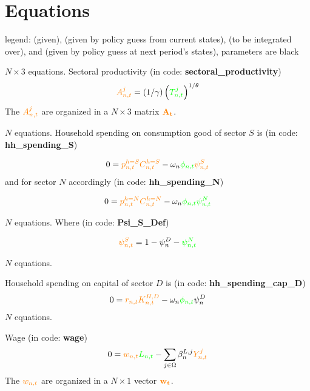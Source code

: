 \documentclass[12pt, bibtotoc, tablecaptionabove, figurecaptionabove, fleqn]{article}
\newcommand{\cl}[1]{{\color{orange}{#1}}}
\newcommand{\st}[1]{{\color{green}{#1}}}
\newcommand{\stnext}[1]{{\color{magenta}{#1}}}
\newcommand{\clnext}[1]{{\color{blue}{#1}}}
\begin{document}
\section{Equations}

legend: \st{states in green} (given), \cl{controls in orange} (given by policy guess from current states), \stnext{next period's exogenous states in magenta} (to be integrated over), and \clnext{next period's controls in blue} (given by policy guess at next period's states), parameters are black\vspace{5mm}

\noindent $N \times 3$ equations. Sectoral productivity (in code: {\bf{sectoral\_productivity}})
\begin{equation}
\cl{A_{n, t}^{j}}=(1 / \gamma)\left(\st{T_{n, t}^{j}}\right)^{1 / \theta}
\end{equation}
The $\cl{A^j_{n,t}}$ are organized in a $ N \times 3$ matrix $\mathbf{\cl{A_t}}$.


$N$ equations. Household spending on consumption good of sector $S$ is (in code: {\bf{hh\_spending\_S}}) 

\begin{equation}
0 = \cl{p^{h=S}_{n,t}} \cl{C^{h=S}_{n,t}} - \omega_n \st{\phi_{n,t}} \cl{\psi_{n,t}^S}
\end{equation}
and for sector $N$ accordingly (in code: {\bf{hh\_spending\_N}})

\begin{equation}
0 = \cl{p^{h=N}_{n,t}} \cl{C^{h=N}_{n,t}} - \omega_n \st{\phi_{n,t}} \st{\psi_{n,t}^N}
\end{equation}

\noindent $N $ equations. Where (in code: {\bf{Psi\_S\_Def}})

\begin{equation}
\cl{\psi_{n,t}^S} = 1 - \psi^D_n - \st{\psi_{n,t}^N}
\end{equation}

\noindent $N $ equations. 

Household spending on capital of sector $D$ is (in code: {\bf{hh\_spending\_cap\_D}})
\begin{equation}
0 = \cl{r_{n, t}} \cl{K_{n, t}^{H,D}} - \omega_n \st{\phi_{n,t}} \psi^D_n
\end{equation}
\noindent $N $ equations. 

Wage (in code: {\bf{wage}})
\begin{equation}
0 = \cl{w_{n, t}} \st{L_{n, t}} -\sum_{j \in \Omega} \beta_{n}^{L, j} \cl{Y_{n, t}^{j}}
\end{equation}
The $\cl{w_{n,t}}$ are organized in a $ N \times 1$ vector $\mathbf{\cl{w_t}}$.
\end{document}
